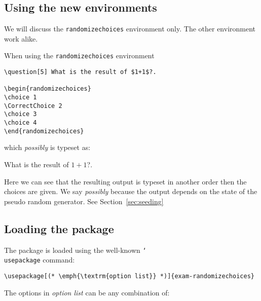 \documentclass[12pt,a4paper]{exam}
\providecommand{\texorpdfstring}[2]{#1}
\newcommand{\bs}{\texorpdfstring{\char`\\}{}}
\begin{document}
\subsection{Using the new environments}
We will discuss the \texttt{randomizechoices} environment only. The other
environment work alike.

When using the \texttt{randomizechoices} environment

\begin{lstlisting}
\question[5] What is the result of $1+1$?.

\begin{randomizechoices}
\choice 1
\CorrectChoice 2
\choice 3
\choice 4
\end{randomizechoices}
\end{lstlisting}

which \emph{possibly} is typeset as:

\begin{questions}
\setcounter{question}{6}
\question[5] What is the result of $1+1$?.

\begin{randomizechoices}
\end{randomizechoices}
\end{questions}

Here we can see that the resulting output is typeset in another order
then the choices are given. We say \emph{possibly} because the output
depends on the state of the pseudo random generator. See Section~\ref{sec:seeding}

\subsection{Loading the package}
The package is loaded using the well-known \texttt{\bs{usepackage}} command:

\begin{lstlisting}
\usepackage[(* \emph{\textrm{option list}} *)]{exam-randomizechoices}
\end{lstlisting}

The options in \emph{\textrm{option list}} can be any combination of:
\end{document}
